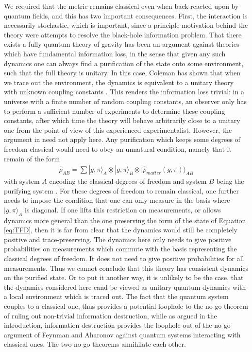\documentclass[aps,pra,showpacs,citeautoscript,amsmath,amssymb,floatfix,superscriptaddress,bbm, verbatim,amsfonts,changes,11pt,nofootinbib,longbibliography]{revtex4-2}
\newcommand{\ket}[1]{|#1\rangle}
\renewcommand{\varrho}{\hat{\rho}}
\begin{document}
We required that\label{par:require} the metric remains classical even when back-reacted upon by quantum fields, and this has two important consequences. First, the interaction is necessarily stochastic, which is important, since a principle motivation behind the theory were attempts to resolve the black-hole information problem.
That there exists a fully quantum theory of gravity has been an argument against theories which have fundamental information loss, in the sense that given any such dynamics one can always find a purification of the state onto some environment, such that the full theory is unitary. 
In this case,  Coleman has shown that when we trace out the environment, the dynamics is equivalent to a unitary theory with unknown coupling constants \cite{coleman1988black}. 
This renders the information loss trivial: in a universe with a finite number of random coupling constants, an observer only has to perform a sufficient number of experiments to determine these coupling constants, after which time the theory will behave arbitrarily close to a unitary one from the  point of view of this experienced experimentalist.\label{par:coleman} However, the argument in  \cite{coleman1988black} need not apply here. Any purification which keeps some degrees of freedom classical would need to obey an unnatural condition, namely that it remain of the form
\begin{align}
\varrho_{AB}=\sum
\ket{g,\pi}_A
\otimes\ket{g,\pi}_B
\otimes\ket{\varrho_{matter}(g,\pi)}_{AB}
\label{eq:TFD}
\end{align}
with system $A$ encoding the
classical degrees of freedom and system $B$ being the purifying system
 \cite{TFD_foot}. For these degrees of freedom to remain classical, one further needs to impose the condition that one can only measure in the basis where $\ket{g,\pi}_A$ is diagonal. If one lifts this restriction on measurements, or allows dynamics more general than the one preserving the form of the state of Equation \eqref{eq:TFD}, then it is far from clear that the dynamics would still be completely positive and trace-preserving. The dynamics here only needs to give positive probabilities on measurements which commute with the basis representing the classical degrees of freedom. It does not need to give positive probabilities for all measurements. Thus we cannot conclude that this theory has consistent dynamics on the purified state. Or to put it another way, it is unlikely to be the case, that the dynamics considered here cand be viewed as unitary quantum dynamics with a local environment which is traced out. The fact that the quantum system couples to a classical one, thus provides a potential loophole to the no-go theorem of  \cite{coleman1988black} ruling out non-trivial information destruction, while as argued in the introduction, information destruction provides the loophole out of the no-go argument of Feynman and Aharonov against quantum systems interacting with classical ones. The two no-go theorems annihilate each other.
\end{document}
